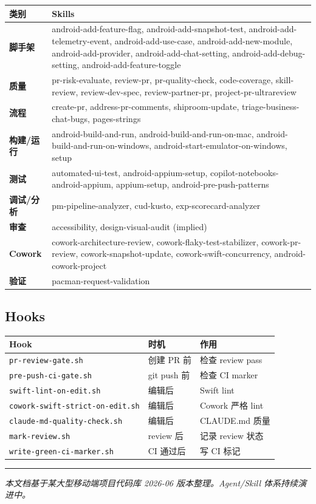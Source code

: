 \begingroup
\scriptsize
\setlength{\tabcolsep}{3pt}
\begin{longtable}{|p{}|p{}|}
\hline
类别 & Skills \\ \hline
\textbf{脚手架} & android-add-feature-flag, android-add-snapshot-test, android-add-telemetry-event, android-add-use-case, android-add-new-module, android-add-provider, android-add-chat-setting, android-add-debug-setting, android-add-feature-toggle \\ \hline
\textbf{质量} & pr-risk-evaluate, review-pr, pr-quality-check, code-coverage, skill-review, review-dev-spec, review-partner-pr, project-pr-ultrareview \\ \hline
\textbf{流程} & create-pr, address-pr-comments, shiproom-update, triage-business-chat-bugs, pages-strings \\ \hline
\textbf{构建/运行} & android-build-and-run, android-build-and-run-on-mac, android-build-and-run-on-windows, android-start-emulator-on-windows, setup \\ \hline
\textbf{测试} & automated-ui-test, android-appium-setup, copilot-notebooks-android-appium, appium-setup, android-pre-push-patterns \\ \hline
\textbf{调试/分析} & pm-pipeline-analyzer, cud-kusto, exp-scorecard-analyzer \\ \hline
\textbf{审查} & accessibility, design-visual-audit (implied) \\ \hline
\textbf{Cowork} & cowork-architecture-review, cowork-flaky-test-stabilizer, cowork-pr-review, cowork-snapshot-update, cowork-swift-concurrency, android-cowork-project \\ \hline
\textbf{验证} & pacman-request-validation \\ \hline
\end{longtable}
\endgroup

\subsection{Hooks}

\begingroup
\scriptsize
\setlength{\tabcolsep}{3pt}
\begin{longtable}{|p{}|p{}|p{}|}
\hline
Hook & 时机 & 作用 \\ \hline
\texttt{pr-review-gate.sh} & 创建 PR 前 & 检查 review pass \\ \hline
\texttt{pre-push-ci-gate.sh} & git push 前 & 检查 CI marker \\ \hline
\texttt{swift-lint-on-edit.sh} & 编辑后 & Swift lint \\ \hline
\texttt{cowork-swift-strict-on-edit.sh} & 编辑后 & Cowork 严格 lint \\ \hline
\texttt{claude-md-quality-check.sh} & 编辑后 & CLAUDE.md 质量 \\ \hline
\texttt{mark-review.sh} & review 后 & 记录 review 状态 \\ \hline
\texttt{write-green-ci-marker.sh} & CI 通过后 & 写 CI 标记 \\ \hline
\end{longtable}
\endgroup

\bigskip\hrule\bigskip

\emph{本文档基于某大型移动端项目代码库 2026-06 版本整理。Agent/Skill 体系持续演进中。}
